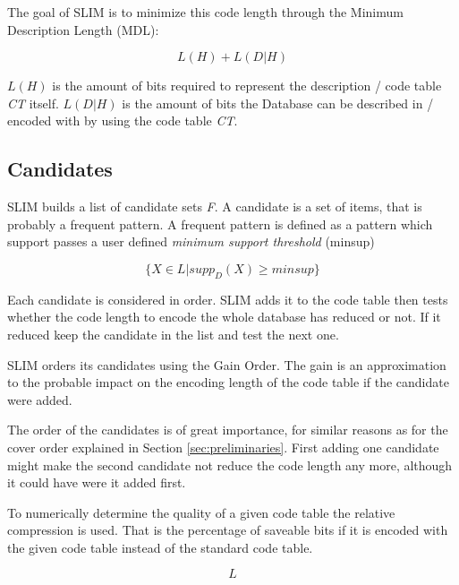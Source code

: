 \documentclass[runningheads]{llncs}
\begin{document}
The goal of SLIM is to minimize this code length through the Minimum Description Length (MDL):

\begin{equation}
\label{eq:mdl}
L(H) + L(D | H)
\end{equation}

$L(H)$ is the amount of bits required to represent the description / code table \emph{CT} itself. $L(D|H)$ is the amount of bits the Database can be described in / encoded with by using the code table \emph{CT}.

\subsection{Candidates}
\label{sec:candidates}
SLIM builds a list of candidate sets \emph{F}.
A candidate is a set of items, that is probably a frequent pattern. A frequent pattern is defined as a pattern which support passes a user defined \emph{minimum support threshold} (minsup)

\begin{equation}
\label{eq:minsup}
\{ X \in L | supp_D(X) \geq minsup \}
\end{equation}

Each candidate is considered in order. SLIM adds it to the code table then tests whether the code length to encode the whole database has reduced or not. If it reduced keep the candidate in the list and test the next one.

SLIM orders its candidates using the Gain Order. The gain is an approximation to the probable impact on the encoding length of the code table if the candidate were added. 

The order of the candidates is of great importance, for similar reasons as for the cover order explained in Section \ref{sec:preliminaries}.
First adding one candidate might make the second candidate not reduce the code length any more, although it could have were it added first.

To numerically determine the quality of a given code table the relative compression is used. That is the percentage of saveable bits if it is encoded with the given code table instead of the standard code table.

\begin{equation}
\label{eq:relative}
L%
\end{equation}
\end{document}
